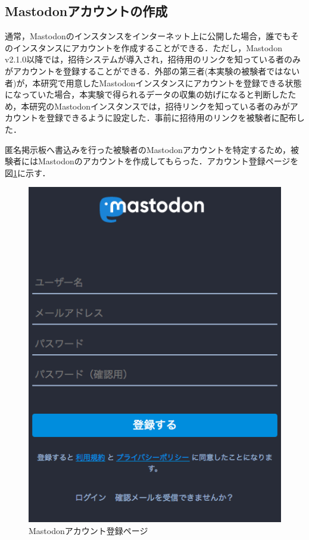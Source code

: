 \documentclass[10pt, a4paper]{jreport}
\begin{document}
\subsection{Mastodonアカウントの作成}
通常，Mastodonのインスタンスをインターネット上に公開した場合，誰でもそのインスタンスにアカウントを作成することができる．ただし，Mastodon v2.1.0以降では，招待システムが導入され，招待用のリンクを知っている者のみがアカウントを登録することができる\cite{invite_system}．外部の第三者(本実験の被験者ではない者)が，本研究で用意したMastodonインスタンスにアカウントを登録できる状態になっていた場合，本実験で得られるデータの収集の妨げになると判断したため，本研究のMastodonインスタンスでは，招待リンクを知っている者のみがアカウントを登録できるように設定した．事前に招待用のリンクを被験者に配布した．

匿名掲示板へ書込みを行った被験者のMastodonアカウントを特定するため，被験者にはMastodonのアカウントを作成してもらった．アカウント登録ページを図\ref{fig: account_registration}に示す．

\begin{figure}[H]
	\begin{center}
		\includegraphics[width=130mm]{figures/account_registration_screenshot.png}
	\end{center}
	\caption{Mastodonアカウント登録ページ}
	\label{fig: account_registration}
\end{figure}
\end{document}
